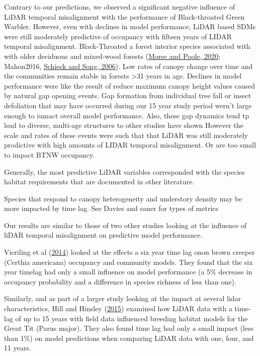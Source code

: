 \documentclass[
]{article}
\begin{document}
Contrary to our predictions, we observed a significant negative influence of LiDAR temporal misalignment with the performance of Black-throated Green Warbler. However, even with declines in model performance, LiDAR based SDMs were still moderately predictive of occupancy with fifteen years of LIDAR temporal misalignment. Black-Throated a forest interior species associated with with older deciduous and mixed-wood forests (\protect\hyperlink{ref-morseBlackthroatedGreenWarbler2020}{Morse and Poole, 2020}; Mahon2016, \protect\hyperlink{ref-Schieck2006}{Schieck and Song, 2006}). Low rates of canopy change over time and the communities remain stable in forests \textgreater31 years in age. Declines in model performance were like the result of reduce maximum canopy height values caused by natural gap opening events. Gap formation from individual tree fall or insect defoliation that may have occurred during our 15 year study period wern't large enough to iumact overall model performance. Also, these gap dynamics tend tp lead to diverse, multi-age structures to other studies have shown However the scale and rates of these events were such that that LiDAR was still moderately prodictive with high amounts of LIDAR temporal misalignment. Or are too small to impact BTNW occupancy.

Generally, the most predictive LiDAR variables corresponded with the species habitat requirements that are documented in other literature.

Species that respond to canopy heterogeneity and understory density may be more impacted by time lag. See Davies and saner for types of metrics

Our results are similar to those of two other studies looking at the influence of liDAR temporal misalignment on predictive model performance.

Vieriling et al (\protect\hyperlink{ref-VierlingSwift2014}{2014}) looked at the effects a six year time lag onon brown creeper (Certhia americana) occupancy and community models. They found that the six year timelag had only a small influence on model performance (a 5\% decrease in occupancy probability and a difference in species richness of less than one).

Similarly, and as part of a larger study looking at the impact at several lidar characteristics, Hill and Hinsley (\protect\hyperlink{ref-hillAirborneLidarWoodland2015}{2015}) examined how LiDAR data with a time-lag of up to 15 years with field data influenced breeding habitat models for the Great Tit (Parus major). They also found time lag had only a small impact (less than 1\%) on model predictions when comparing LiDAR data with one, four, and 11 years.
\end{document}
